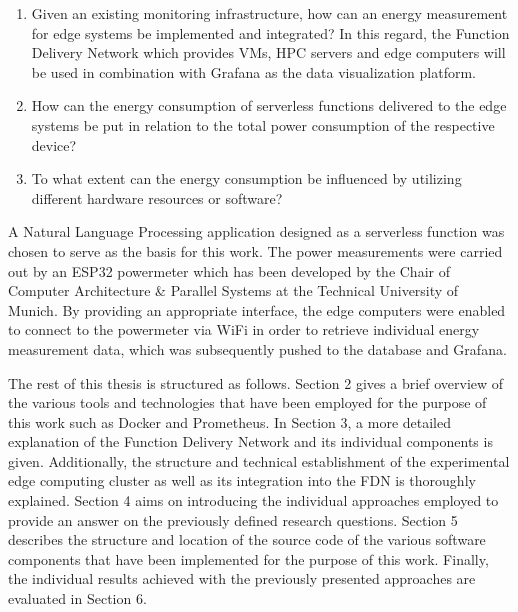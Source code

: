 \begin{enumerate}
  \item Given an existing monitoring infrastructure, how can an energy measurement for edge systems be implemented and integrated? In this regard, the Function Delivery Network which provides VMs, HPC servers and edge computers will be used in combination with Grafana as the data visualization platform.
  \item How can the energy consumption of serverless functions delivered to the edge systems be put in relation to the total power consumption of the respective device?
  \item To what extent can the energy consumption be influenced by utilizing different hardware resources or software?
\end{enumerate}

A Natural Language Processing application designed as a serverless function was chosen to serve as the basis for this work. The power measurements were carried out by an ESP32 powermeter which has been developed by the Chair of Computer Architecture \& Parallel Systems at the Technical University of Munich. By providing an appropriate interface, the edge computers were enabled to connect to the powermeter via WiFi in order to retrieve individual energy measurement data, which was subsequently pushed to the database and Grafana.

The rest of this thesis is structured as follows. Section 2 gives a brief overview of the various tools and technologies that have been employed for the purpose of this work such as Docker and Prometheus. In Section 3, a more detailed explanation of the Function Delivery Network and its individual components is given. Additionally, the structure and technical establishment of the experimental edge computing cluster as well as its integration into the FDN is thoroughly explained. Section 4 aims on introducing the individual approaches employed to provide an answer on the previously defined research questions. Section 5 describes the structure and location of the source code of the various software components that have been implemented for the purpose of this work. Finally, the individual results achieved with the previously presented approaches are evaluated in Section 6.